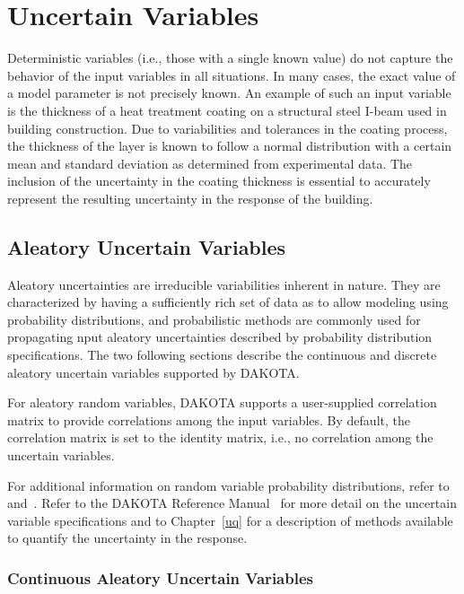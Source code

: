 \section{Uncertain Variables}\label{variables:uncertain}


Deterministic variables (i.e., those with a single known value) do not
capture the behavior of the input variables in all situations. In many
cases, the exact value of a model parameter is not precisely known. An
example of such an input variable is the thickness of a heat treatment
coating on a structural steel I-beam used in building construction.
Due to variabilities and tolerances in the coating process, the
thickness of the layer is known to follow a normal distribution with a
certain mean and standard deviation as determined from experimental
data. The inclusion of the uncertainty in the coating thickness is
essential to accurately represent the resulting uncertainty in the
response of the building.

\subsection{Aleatory Uncertain Variables}\label{variables:uncertain:auv}

Aleatory uncertainties are irreducible variabilities inherent in
nature.  They are characterized by having a sufficiently rich set of
data as to allow modeling using probability distributions, and
probabilistic methods are commonly used for propagating nput aleatory
uncertainties described by probability distribution specifications.
The two following sections describe the continuous and discrete
aleatory uncertain variables supported by DAKOTA.

For aleatory random variables, DAKOTA supports a user-supplied
correlation matrix to provide correlations among the input
variables. By default, the correlation matrix is set to the identity
matrix, i.e., no correlation among the uncertain variables.

For additional information on random variable probability
distributions, refer to~\cite{Hal00} and~\cite{Swi04}. Refer to the DAKOTA
Reference Manual~\cite{RefMan} for more detail on the uncertain variable
specifications and to Chapter~\ref{uq} for a description of methods
available to quantify the uncertainty in the response.

\subsubsection{Continuous Aleatory Uncertain Variables}\label{variables:uncertain:cauv}

